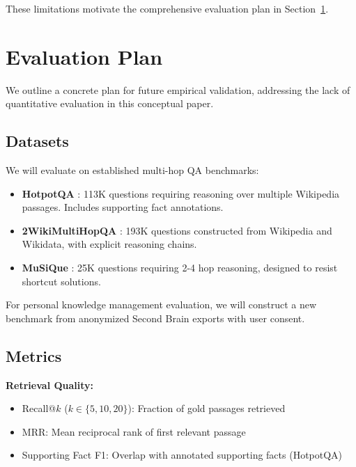 \documentclass[11pt,a4paper]{article}
\begin{document}
These limitations motivate the comprehensive evaluation plan in Section~\ref{sec:evaluation_plan}.

\section{Evaluation Plan}
\label{sec:evaluation_plan}

We outline a concrete plan for future empirical validation, addressing the lack of quantitative evaluation in this conceptual paper.

\subsection{Datasets}

We will evaluate on established multi-hop QA benchmarks:

\begin{itemize}
    \item \textbf{HotpotQA} \citep{yang2018hotpotqa}: 113K questions requiring reasoning over multiple Wikipedia passages. Includes supporting fact annotations.
    
    \item \textbf{2WikiMultiHopQA} \citep{ho2020constructing}: 193K questions constructed from Wikipedia and Wikidata, with explicit reasoning chains.
    
    \item \textbf{MuSiQue} \citep{trivedi2022musique}: 25K questions requiring 2-4 hop reasoning, designed to resist shortcut solutions.
\end{itemize}

For personal knowledge management evaluation, we will construct a new benchmark from anonymized Second Brain exports with user consent.

\subsection{Metrics}

\textbf{Retrieval Quality:}
\begin{itemize}
    \item Recall@$k$ ($k \in \{5, 10, 20\}$): Fraction of gold passages retrieved
    \item MRR: Mean reciprocal rank of first relevant passage
    \item Supporting Fact F1: Overlap with annotated supporting facts (HotpotQA)
\end{itemize}
\end{document}
